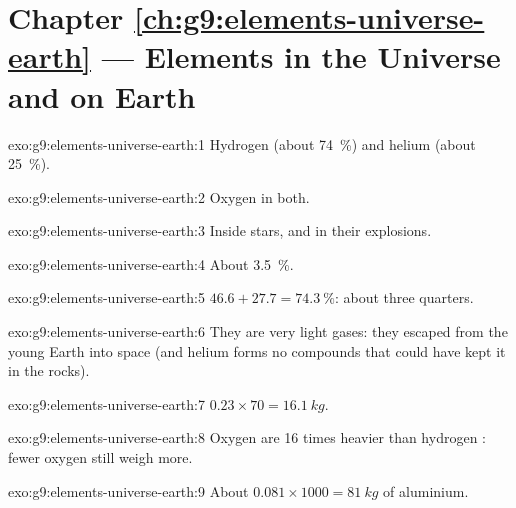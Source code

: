 \section*{Chapter \ref{ch:g9:elements-universe-earth} --- Elements in the Universe and on Earth}

\begin{solution}{exo:g9:elements-universe-earth:1}
Hydrogen (about \qty{74}{\percent}) and helium (about
\qty{25}{\percent}).
\end{solution}

\begin{solution}{exo:g9:elements-universe-earth:2}
Oxygen in both.
\end{solution}

\begin{solution}{exo:g9:elements-universe-earth:3}
Inside stars, and in their explosions.
\end{solution}

\begin{solution}{exo:g9:elements-universe-earth:4}
About \qty{3.5}{\percent}.
\end{solution}

\begin{solution}{exo:g9:elements-universe-earth:5}
$46.6 + 27.7 = \qty{74.3}{\percent}$: about three quarters.
\end{solution}

\begin{solution}{exo:g9:elements-universe-earth:6}
They are very light gases: they escaped from the young Earth into space
(and helium forms no compounds that could have kept it in the rocks).
\end{solution}

\begin{solution}{exo:g9:elements-universe-earth:7}
$0.23 \times 70 = \qty{16.1}{kg}$.
\end{solution}

\begin{solution}{exo:g9:elements-universe-earth:8}
Oxygen  are 16 times heavier than hydrogen : fewer oxygen 
still weigh more.
\end{solution}

\begin{solution}{exo:g9:elements-universe-earth:9}
About $0.081 \times 1000 = \qty{81}{kg}$ of aluminium.
\end{solution}

